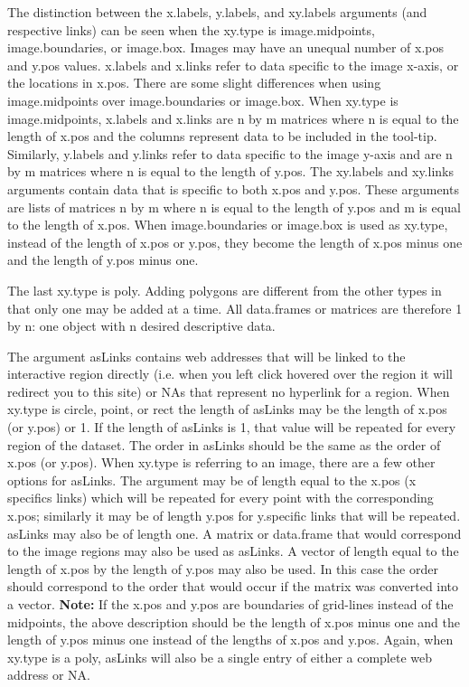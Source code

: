 \documentclass[]{article}
\begin{document}
\indent  The distinction between the x.labels, y.labels, and xy.labels arguments (and respective links) can be seen when the xy.type is image.midpoints, image.boundaries, or image.box. Images may have an unequal number of x.pos and y.pos values. x.labels and x.links refer to data specific to the image x-axis, or the locations in x.pos. There are some slight differences when using image.midpoints over image.boundaries or image.box. When xy.type is image.midpoints, x.labels and x.links are n by m matrices where n is equal to the length of x.pos and the columns represent data to be included in the tool-tip. Similarly, y.labels and y.links refer to data specific to the image y-axis and are n by m matrices where n is equal to the length of y.pos. The xy.labels and xy.links arguments contain data that is specific to both x.pos and y.pos. These arguments are lists of matrices n by m where n is equal to the length of y.pos and m is equal to the length of x.pos. When image.boundaries or image.box is used as xy.type, instead of the length of x.pos or y.pos, they become the length of x.pos minus one and the length of y.pos minus one. \newline

\indent The last xy.type is poly. Adding polygons are different from the other types in that only one may be added at a time. All data.frames or matrices are therefore 1 by n: one object with n desired descriptive data. \newline

\indent  The argument asLinks contains web addresses that will be linked to the interactive region directly (i.e. when you left click hovered over the region it will redirect you to this site) or NAs that represent no hyperlink for a region.  When xy.type is circle, point, or rect the length of asLinks may be the length of x.pos (or y.pos)  or 1.  If the length of asLinks is 1, that value will be repeated for every region of the dataset. The order in asLinks should be the same as the order of x.pos (or y.pos).  When xy.type is referring to an image, there are a few other options for asLinks.  The argument may be of length equal to the x.pos (x specifics links) which will be repeated for every point with the corresponding x.pos; similarly it may be of length y.pos for y.specific links that will be repeated. asLinks may also be of length one.  A matrix or data.frame that would correspond to the image regions may also be used as asLinks. A vector of length equal to the length of x.pos by the length of y.pos may also be used.  In this case the order should correspond to the order that would occur if the matrix was converted into a vector. {\bf{Note:}} If the x.pos and y.pos are boundaries of grid-lines instead of the midpoints, the above description should be the length of x.pos minus one and the length of y.pos minus one instead of the lengths of x.pos and y.pos. Again, when xy.type is a poly, asLinks will also be a single entry of either a complete web address or NA. 
\end{document}
